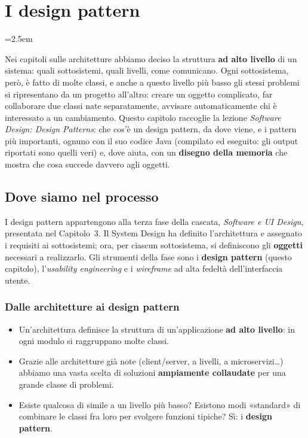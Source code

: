 \chapter{I design pattern}
\emergencystretch=2.5em

Nei capitoli sulle architetture abbiamo deciso la struttura \textbf{ad alto livello} di un sistema: quali sottosistemi,
quali livelli, come comunicano. Ogni sottosistema, però, è fatto di molte classi, e anche a questo livello più basso gli
stessi problemi si ripresentano da un progetto all'altro: creare un oggetto complicato, far collaborare due classi nate
separatamente, avvisare automaticamente chi è interessato a un cambiamento. Questo capitolo raccoglie la lezione
\textit{Software Design: Design Patterns}: che cos'è un design pattern, da dove viene, e i pattern più importanti, ognuno con
il suo codice Java (compilato ed eseguito: gli output riportati sono quelli veri) e, dove aiuta, con un \textbf{disegno della
memoria} che mostra che cosa succede davvero agli oggetti.

\section{Dove siamo nel processo}


I design pattern appartengono alla terza fase della cascata, \textit{Software e UI Design}, presentata nel Capitolo~3. Il
System Design ha definito l'architettura e assegnato i requisiti ai sottosistemi; ora, per ciascun sottosistema, si
definiscono gli \textbf{oggetti} necessari a realizzarlo. Gli strumenti della fase sono i \textbf{design pattern}
(questo capitolo), l'\textit{usability engineering} e i \textit{wireframe} ad alta fedeltà dell'interfaccia utente.

\subsection{Dalle architetture ai design pattern}

\begin{itemize}
  \item Un'architettura definisce la struttura di un'applicazione \textbf{ad alto livello}: in ogni modulo si raggruppano
        molte classi.
  \item Grazie alle architetture già note (client/server, a livelli, a microservizi\ldots) abbiamo una vasta scelta di
        soluzioni \textbf{ampiamente collaudate} per una grande classe di problemi.
  \item Esiste qualcosa di simile a un livello più basso? Esistono modi «standard» di combinare le classi fra loro per
        svolgere funzioni tipiche? Sì: i \textbf{design pattern}.
\end{itemize}

